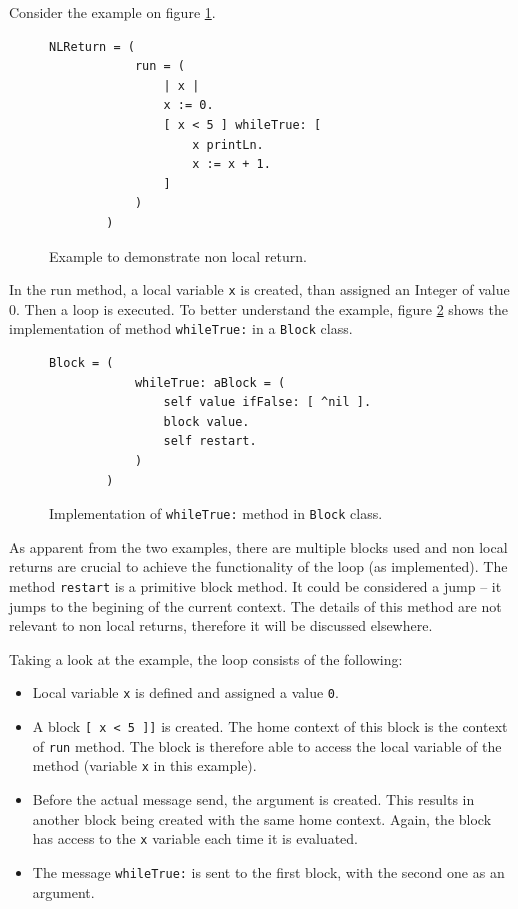 \documentclass[thesis=M,english]{FITthesis}[2019/12/23]
\begin{document}
Consider the example on figure \ref{fig:nlreturn_1}.

\begin{figure}[h!]
	\centering
	\begin{lstlisting}[language=Smalltalk]
		NLReturn = (
			run = (
				| x |
				x := 0.
				[ x < 5 ] whileTrue: [
					x printLn.
					x := x + 1.
				]
			)
		)
	\end{lstlisting}
	\caption{Example to demonstrate non local return.}
	\label{fig:nlreturn_1}
\end{figure}

In the run method, a local variable \texttt{x} is created, than assigned an Integer of value 0. Then a loop is
executed. To better understand the example, figure \ref{fig:block_whileTrue} shows the implementation of method \texttt{whileTrue:} in a
\texttt{Block} class.

\begin{figure}[h!]
	\centering
	\begin{lstlisting}[language=Smalltalk]
		Block = (
			whileTrue: aBlock = (
				self value ifFalse: [ ^nil ].
				block value.
				self restart.
			)
		)
	\end{lstlisting}
	\caption{Implementation of \texttt{whileTrue:} method in \texttt{Block} class.}
	\label{fig:block_whileTrue}
\end{figure}

As apparent from the two examples, there are multiple blocks used and non local returns are crucial to achieve the functionality of the loop
(as implemented). The method \texttt{restart} is a primitive block method. It could be considered a jump -- it jumps to the begining of the current
context. The details of this method are not relevant to non local returns, therefore it will be discussed elsewhere.

Taking a look at the example, the loop consists of the following:
\begin{itemize}
	\item Local variable \texttt{x} is defined and assigned a value \texttt{0}.
	\item A block \texttt{[ x < 5 ]]} is created. The home context of this block is the context of \texttt{run} method. The block is therefore
		able to access the local variable of the method (variable \texttt{x} in this example).
	\item Before the actual message send, the argument is created. This results in another block being created with the same home context. Again, the block
		has access to the \texttt{x} variable each time it is evaluated.
	\item The message \texttt{whileTrue:} is sent to the first block, with the second one as an argument.
\end{itemize}
\end{document}

